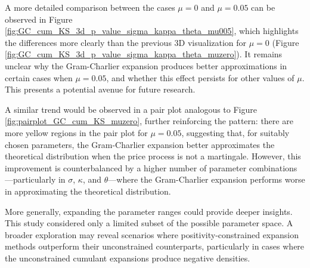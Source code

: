 A more detailed comparison between the cases $\mu = 0$ and $\mu = 0.05$ can be observed in Figure \ref{fig:GC_cum_KS_3d_p_value_sigma_kappa_theta_mu005}, which highlights the differences more clearly than the previous 3D visualization for $\mu = 0$ (Figure \ref{fig:GC_cum_KS_3d_p_value_sigma_kappa_theta_muzero}). It remains unclear why the Gram-Charlier expansion produces better approximations in certain cases when $\mu = 0.05$, and whether this effect persists for other values of $\mu$. This presents a potential avenue for future research.

A similar trend would be observed in a pair plot analogous to Figure \ref{fig:pairplot_GC_cum_KS_muzero}, further reinforcing the pattern: there are more yellow regions in the pair plot for $\mu = 0.05$, suggesting that, for suitably chosen parameters, the Gram-Charlier expansion better approximates the theoretical distribution when the price process is not a martingale. However, this improvement is counterbalanced by a higher number of parameter combinations—particularly in $\sigma$, $\kappa$, and $\theta$—where the Gram-Charlier expansion performs worse in approximating the theoretical distribution.

More generally, expanding the parameter ranges could provide deeper insights. This study considered only a limited subset of the possible parameter space. A broader exploration may reveal scenarios where positivity-constrained expansion methods outperform their unconstrained counterparts, particularly in cases where the unconstrained cumulant expansions produce negative densities.